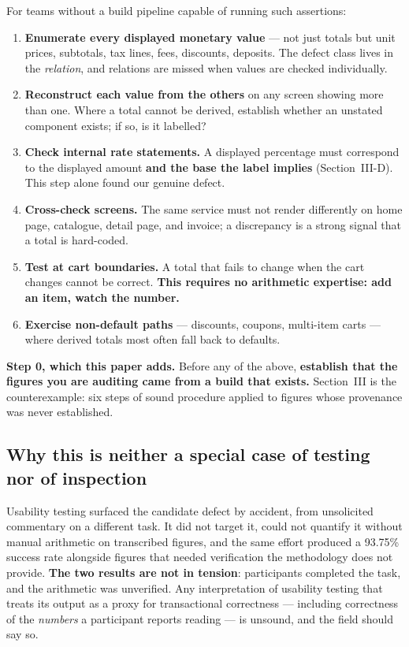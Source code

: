 \documentclass[conference]{IEEEtran}
\begin{document}
For teams without a build pipeline capable of running such assertions:
\begin{enumerate}
\item \textbf{Enumerate every displayed monetary value} --- not just totals but unit prices, subtotals,
      tax lines, fees, discounts, deposits. The defect class lives in the \emph{relation}, and relations
      are missed when values are checked individually.
\item \textbf{Reconstruct each value from the others} on any screen showing more than one. Where a total
      cannot be derived, establish whether an unstated component exists; if so, is it labelled?
\item \textbf{Check internal rate statements.} A displayed percentage must correspond to the displayed
      amount \textbf{and the base the label implies} (Section~III-D). This step alone found our
      genuine defect.
\item \textbf{Cross-check screens.} The same service must not render differently on home page, catalogue,
      detail page, and invoice; a discrepancy is a strong signal that a total is hard-coded.
\item \textbf{Test at cart boundaries.} A total that fails to change when the cart changes cannot be
      correct. \textbf{This requires no arithmetic expertise: add an item, watch the number.}
\item \textbf{Exercise non-default paths} --- discounts, coupons, multi-item carts --- where derived
      totals most often fall back to defaults.
\end{enumerate}

\textbf{Step 0, which this paper adds.} Before any of the above, \textbf{establish that the figures you
are auditing came from a build that exists.} Section~III is the counterexample: six steps of sound
procedure applied to figures whose provenance was never established.

\subsection{Why this is neither a special case of testing nor of inspection}

Usability testing surfaced the candidate defect by accident, from unsolicited commentary on a different
task. It did not target it, could not quantify it without manual arithmetic on transcribed figures, and
the same effort produced a 93.75\% success rate alongside figures that needed verification the
methodology does not provide. \textbf{The two results are not in tension}: participants completed the
task, and the arithmetic was unverified. Any interpretation of usability testing that treats its output
as a proxy for transactional correctness --- including correctness of the \emph{numbers} a participant
reports reading --- is unsound, and the field should say so.
\end{document}
